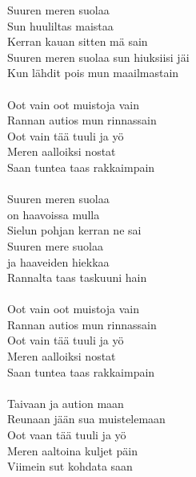 
Suuren meren suolaa \\
Sun huuliltas maistaa \\
Kerran kauan sitten mä sain \\
Suuren meren suolaa sun hiuksiisi jäi \\
Kun lähdit pois mun maailmastain \\
\hspace{10mm}\\
Oot vain oot muistoja vain \\
Rannan autios mun rinnassain \\
Oot vain tää tuuli ja yö \\
Meren aalloiksi nostat \\
Saan tuntea taas rakkaimpain \\
\hspace{10mm}\\
Suuren meren suolaa \\
on haavoissa mulla \\
Sielun pohjan kerran ne sai \\
Suuren mere suolaa \\
ja haaveiden hiekkaa \\
Rannalta taas taskuuni hain \\
\hspace{10mm}\\
Oot vain oot muistoja vain \\
Rannan autios mun rinnassain \\
Oot vain tää tuuli ja yö \\
Meren aalloiksi nostat \\
Saan tuntea taas rakkaimpain \\
\hspace{10mm}\\
Taivaan ja aution maan \\
Reunaan jään sua muistelemaan \\
Oot vaan tää tuuli ja yö \\
Meren aaltoina kuljet päin \\
Viimein sut kohdata saan\\